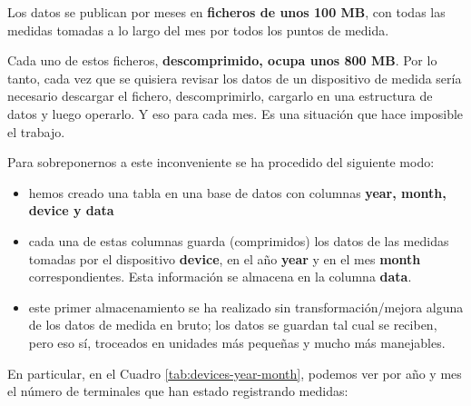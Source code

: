 \documentclass[]{book}
\providecommand{\tightlist}{%
  \setlength{\itemsep}{0pt}\setlength{\parskip}{0pt}}
\begin{document}
Los datos se publican por meses en \textbf{ficheros de unos 100 MB}, con
todas las medidas tomadas a lo largo del mes por todos los puntos de
medida.

Cada uno de estos ficheros, \textbf{descomprimido, ocupa unos 800 MB}.
Por lo tanto, cada vez que se quisiera revisar los datos de un
dispositivo de medida sería necesario descargar el fichero,
descomprimirlo, cargarlo en una estructura de datos y luego operarlo. Y
eso para cada mes. Es una situación que hace imposible el trabajo.

Para sobreponernos a este inconveniente se ha procedido del siguiente
modo:

\begin{itemize}
\tightlist
\item
  hemos creado una tabla en una base de datos con columnas \textbf{year,
  month, device y data}
\item
  cada una de estas columnas guarda (comprimidos) los datos de las
  medidas tomadas por el dispositivo \textbf{device}, en el año
  \textbf{year} y en el mes \textbf{month} correspondientes. Esta
  información se almacena en la columna \textbf{data}.
\item
  este primer almacenamiento se ha realizado sin transformación/mejora
  alguna de los datos de medida en bruto; los datos se guardan tal cual
  se reciben, pero eso sí, troceados en unidades más pequeñas y mucho
  más manejables.
\end{itemize}

En particular, en el Cuadro \ref{tab:devices-year-month}, podemos ver
por año y mes el número de terminales que han estado registrando
medidas:
\end{document}
